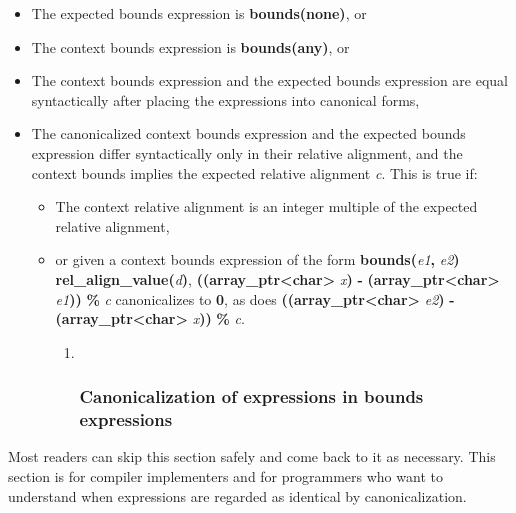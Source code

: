 \documentclass[]{article}
\begin{document}
\begin{itemize}
\item
  The expected bounds expression is \textbf{bounds(none)}, or
\item
  The context bounds expression is \textbf{bounds(any)}, or
\item
  The context bounds expression and the expected bounds expression are
  equal syntactically after placing the expressions into canonical
  forms,
\item
  The canonicalized context bounds expression and the expected bounds
  expression differ syntactically only in their relative alignment, and
  the context bounds implies the expected relative alignment \emph{c}.
  This is true if:

  \begin{itemize}
  \item
    The context relative alignment is an integer multiple of the
    expected relative alignment,
  \item
    or given a context bounds expression of the form
    \textbf{bounds(}\emph{e1}\textbf{,} \emph{e2}\textbf{)}
    \textbf{rel\_align\_value(}\emph{d}\textbf{)},
    \textbf{((array\_ptr\textless{}char\textgreater{}}
    \emph{x}\textbf{)} \textbf{-}
    \textbf{(array\_ptr\textless{}char\textgreater{}}
    \emph{e1}\textbf{))} \textbf{\%} \emph{c} canonicalizes to
    \textbf{0}, as does
    \textbf{((array\_ptr\textless{}char\textgreater{}}
    \emph{e2}\textbf{)} \textbf{-}
    \textbf{(array\_ptr\textless{}char\textgreater{}}
    \emph{x}\textbf{))} \textbf{\%} \emph{c}.

    \begin{enumerate}
    \def\labelenumi{\arabic{enumi}.}
    \item ~
      \subsubsection{\texorpdfstring{\protect\hypertarget{ux5fToc437460788}{}{\protect\hypertarget{ux5fToc440445467}{}{\protect\hypertarget{ux5fToc440449249}{}{\protect\hypertarget{ux5fToc440551899}{}{}}}}Canonicalization
      of expressions in bounds
      expressions}{Canonicalization of expressions in bounds expressions}}\label{canonicalization-of-expressions-in-bounds-expressions}
    \end{enumerate}
  \end{itemize}
\end{itemize}

Most readers can skip this section safely and come back to it as
necessary. This section is for compiler implementers and for programmers
who want to understand when expressions are regarded as identical by
canonicalization.
\end{document}
